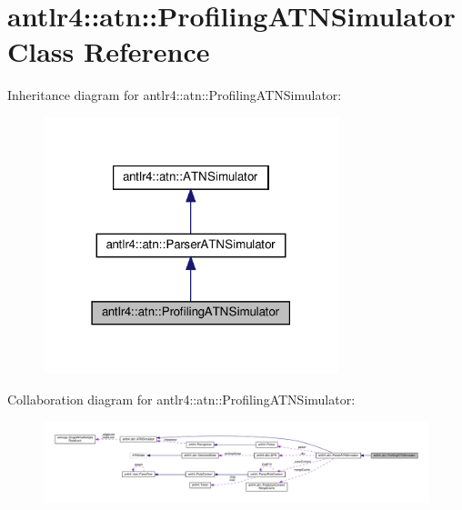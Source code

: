 \hypertarget{classantlr4_1_1atn_1_1ProfilingATNSimulator}{}\section{antlr4\+:\+:atn\+:\+:Profiling\+A\+T\+N\+Simulator Class Reference}
\label{classantlr4_1_1atn_1_1ProfilingATNSimulator}


Inheritance diagram for antlr4\+:\+:atn\+:\+:Profiling\+A\+T\+N\+Simulator\+:
\nopagebreak
\begin{figure}[H]
\begin{center}
\leavevmode
\includegraphics[width=243pt]{classantlr4_1_1atn_1_1ProfilingATNSimulator__inherit__graph}
\end{center}
\end{figure}


Collaboration diagram for antlr4\+:\+:atn\+:\+:Profiling\+A\+T\+N\+Simulator\+:
\nopagebreak
\begin{figure}[H]
\begin{center}
\leavevmode
\includegraphics[width=350pt]{classantlr4_1_1atn_1_1ProfilingATNSimulator__coll__graph}
\end{center}
\end{figure}
